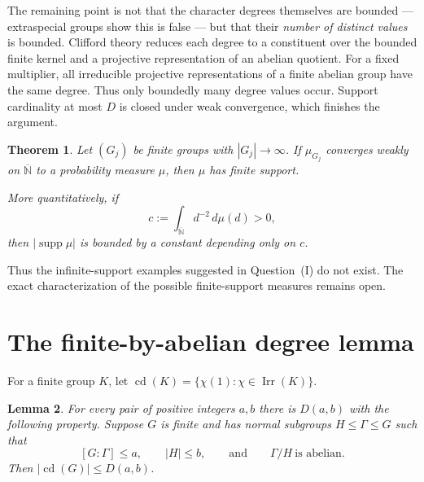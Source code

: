 \documentclass[11pt]{article}
\newtheorem{theorem}{Theorem}
\newtheorem{lemma}[theorem]{Lemma}
\newcommand{\Irr}{\operatorname{Irr}}
\newcommand{\cd}{\operatorname{cd}}
\begin{document}
The remaining point is not that the character degrees themselves are bounded
--- extraspecial groups show this is false --- but that their \emph{number of
distinct values} is bounded.  Clifford theory reduces each degree to a
constituent over the bounded finite kernel and a projective representation of
an abelian quotient.  For a fixed multiplier, all irreducible projective
representations of a finite abelian group have the same degree.  Thus only
boundedly many degree values occur.  Support cardinality at most $D$ is closed
under weak convergence, which finishes the argument.

\begin{theorem}\label{thm:main}
Let $(G_j)$ be finite groups with $|G_j|\to\infty$.  If
$\mu_{G_j}$ converges weakly on $\overline{\mathbb N}$ to a probability
measure $\mu$, then $\mu$ has finite support.

More quantitatively, if
\[
 c:=\int_{\overline{\mathbb N}}d^{-2}\,d\mu(d)>0,
\]
then $|\operatorname{supp}\mu|$ is bounded by a constant depending only on
$c$.
\end{theorem}

Thus the infinite-support examples suggested in Question~(I) do not exist.
The exact characterization of the possible finite-support measures remains
open.

\section{The finite-by-abelian degree lemma}

For a finite group $K$, let
$\cd(K)=\{\chi(1):\chi\in\Irr(K)\}$.

\begin{lemma}\label{lem:degrees}
For every pair of positive integers $a,b$ there is $D(a,b)$ with the
following property.  Suppose $G$ is finite and has normal subgroups
$H\leq \Gamma\leq G$ such that
\[
 [G:\Gamma]\leq a,\qquad |H|\leq b,
 \qquad\text{and}\qquad \Gamma/H\ \text{is abelian}.
\]
Then $|\cd(G)|\leq D(a,b)$.
\end{lemma}
\end{document}

